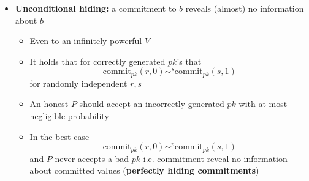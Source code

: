 \begin{itemize}
\begin{itemize}
\begin{itemize}
    \end{itemize}
		\item \textbf{Unconditional hiding:} a commitment to $b$ reveals (almost) no information about $b$
    \begin{itemize}
			\item Even to an infinitely powerful $V$
			\item It holds that for correctly generated $pk$'s that
      \[
        \text{commit}_{pk}(r,0) \sim^s \text{commit}_{pk}(s,1)
      \]
			for randomly independent $r,s$ 
			\item An honest $P$ should accept an incorrectly generated $pk$ with at most negligible probability
			\item In the best case 
      \[
        \text{commit}_{pk}(r,0) \sim^p \text{commit}_{pk}(s,1)
      \]
      and $P$ never accepts a bad $pk$ i.e. commitment reveal no information about committed values (\textbf{perfectly hiding commitments})
    \end{itemize}
  \end{itemize}
\end{itemize}

